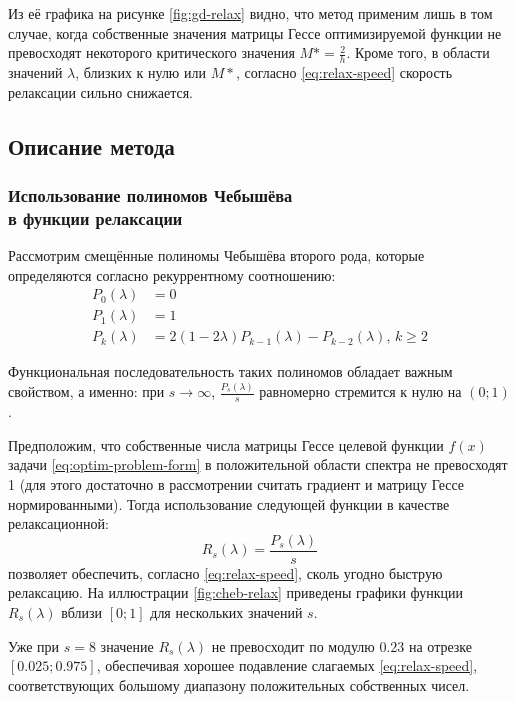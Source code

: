 \documentclass{article}
\renewcommand{\geq}{\geqslant}
\theoremstyle{remark}
\theoremstyle{definition}
\numberwithin{equation}{section}
\begin{document}


Из её графика на рисунке \ref{fig:gd-relax} видно, что метод применим
лишь в том случае, когда собственные значения матрицы Гессе
оптимизируемой функции не превосходят некоторого критического значения
$M*=\frac{2}{h}$. Кроме того, в области значений $\lambda$, близких к
нулю или $M*$, согласно \eqref{eq:relax-speed} скорость релаксации
сильно снижается.

\subsection{Описание метода}

\subsubsection{Использование полиномов Чебышёва\\
  в функции релаксации}

Рассмотрим смещённые полиномы Чебышёва второго рода, которые
определяются согласно рекуррентному соотношению:
\begin{align*}
  \label{eq:chebyshev}
  P_0(\lambda) &= 0 \\
  P_1(\lambda) &= 1 \\
  P_k(\lambda) &= 2(1-2\lambda)P_{k-1}(\lambda) - P_{k-2}(\lambda),\, k
  \geq 2
\end{align*}

Функциональная последовательность таких полиномов обладает важным
свойством, а именно: при $s\to\infty$, $\frac{P_s(\lambda)}{s}$
равномерно стремится к нулю на $(0;1)$.

Предположим, что собственные числа матрицы Гессе целевой функции
$f(x)$ задачи \eqref{eq:optim-problem-form} в положительной области
спектра не превосходят 1 (для этого достаточно в рассмотрении считать
градиент и матрицу Гессе нормированными). Тогда использование
следующей функции в качестве релаксационной:
\begin{equation}
  \label{eq:cheb-relax}
  R_s(\lambda) = \frac{P_s(\lambda)}{s}
\end{equation}
позволяет обеспечить, согласно \eqref{eq:relax-speed}, сколь угодно
быструю релаксацию. На иллюстрации \ref{fig:cheb-relax} приведены
графики функции $R_s(\lambda)$ вблизи $[0;1]$ для нескольких значений
$s$.



Уже при $s=8$ значение $R_s(\lambda)$ не превосходит по модулю $0.23$
на отрезке $[0.025; 0.975]$, обеспечивая хорошее подавление слагаемых
\eqref{eq:relax-speed}, соответствующих большому диапазону
положительных собственных чисел.
\end{document}
